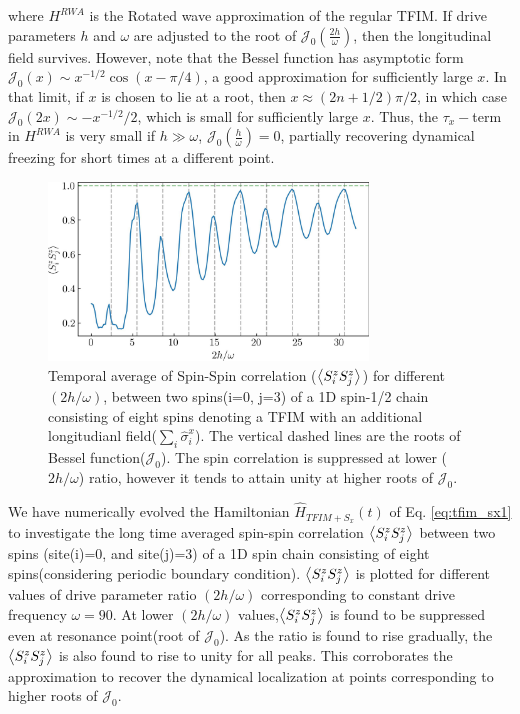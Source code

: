 \documentclass[aps,prb,reprint,showpacs,floatfix,superscriptaddress, onecolumn, nofootinbib, 9pt]{revtex4-2}
\begin{document}
\begin{enumerate}
{\begin{equation}
			\label{eq:tfim_sx1}
		\end{equation}
		where $H^{RWA}$ is the Rotated wave approximation of the regular TFIM. If drive parameters $h$ and $\omega$ are adjusted to the root of $\mathcal{J}_0\left(\frac{2h}{\omega}\right)$, then the longitudinal field survives. However, note that the Bessel function has asymptotic form $\mathcal{J}_0(x)\sim x^{-1/2}\cos(x-\pi/4)$, a good approximation for sufficiently  large $x$. In that limit, if $x$ is chosen to lie at a root, then $x\approx (2n+1/2)\pi/2$, in which case $\mathcal{J}_0(2x) \sim -x^{-1/2}/2$, which is small for sufficiently large $x$. Thus, the $\tau_x-$term in $H^{RWA}$ is very small if $h\gg\omega$, $\mathcal{J}_0\left(\frac{h}{\omega}\right)=0$, partially recovering dynamical freezing for short times at a different point.

		\begin{figure}[h!]
			\includegraphics[width=8.5cm]{corrN8sz0sz3avg_onlynn_tfim_sx.jpeg}
			\caption{Temporal average of Spin-Spin correlation ($\expval{S^z_i S^z_j}$) for different $(2h/\omega)$, between two spins(i=0, j=3) of a 1D spin-1/2 chain consisting of eight spins denoting a TFIM with an additional longitudianl field($\sum_i\hat{\sigma}^x_i$).  The  vertical dashed lines are the roots of Bessel function($\mathcal{J}_0$). The spin correlation is suppressed at lower ($2h/\omega$) ratio, however it tends to attain unity at higher roots of $\mathcal{J}_0$.}
			\label{fig:TFIM_sx}
		\end{figure}

		We have numerically evolved the Hamiltonian $\hat{H}_{TFIM+S_x}(t)$ of Eq. \eqref{eq:tfim_sx1} to investigate the long time averaged spin-spin correlation $\expval{S^z_i S^z_{j}}$ between two spins (site(i)=0, and site(j)=3) of a 1D spin chain consisting of eight spins(considering periodic boundary condition).  $\expval{S^z_i S^z_{j}}$ is plotted for different values of drive parameter ratio $(2h/\omega)$ corresponding to constant drive frequency $\omega=90$. At lower $(2h/\omega)$ values,$\expval{S^z_i S^z_{j}}$ is found to be suppressed even at resonance point(root of $\mathcal{J}_0$). As the ratio is found to rise gradually, the $\expval{S^z_i S^z_{j}}$ is also found to rise to unity for all peaks. This corroborates the approximation to recover the dynamical localization at points corresponding to higher roots of $\mathcal{J}_0$.
		}


\end{enumerate}
\end{document}
